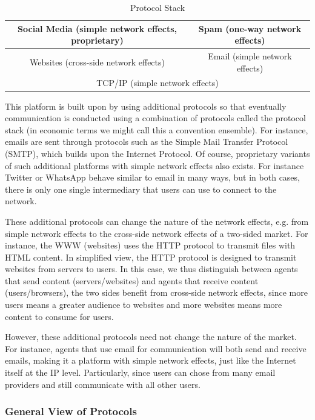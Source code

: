 \documentclass[a4paper,british]{article}\usepackage[]{graphicx}\usepackage[]{color}
\providecommand{\tabularnewline}{\\}
\begin{document}
\begin{table}[H]
\caption{Protocol Stack}

\centering{}%
\begin{tabular}{|c|c|}
\hline 
Social Media (simple network effects, proprietary) &
Spam (one-way network effects)\tabularnewline
\hline 
Websites (cross-side network effects) &
Email (simple network effects)\tabularnewline
\hline 
\multicolumn{2}{|c|}{TCP/IP (simple network effects)}\tabularnewline
\hline 
\end{tabular}
\end{table}

This platform is built upon by using additional protocols so that
eventually communication is conducted using a combination of protocols
called the protocol stack (in economic terms we might call this a
\textquotedbl convention ensemble\textquotedbl ). For instance,
emails are sent through protocols such as the Simple Mail Transfer
Protocol (SMTP), which builds upon the Internet Protocol. Of course,
proprietary variants of such additional platforms with simple network
effects also exists. For instance Twitter or WhatsApp behave similar
to email in many ways, but in both cases, there is only one single
intermediary that users can use to connect to the network.

These additional protocols can change the nature of the network effects,
e.g. from simple network effects to the cross-side network effects
of a two-sided market. For instance, the WWW (websites) uses the HTTP
protocol to transmit files with HTML content. In simplified view,
the HTTP protocol is designed to transmit websites from servers to
users. In this case, we thus distinguish between agents that send
content (servers/websites) and agents that receive content (users/browsers),
the two sides benefit from cross-side network effects, since more
users means a greater audience to websites and more websites means
more content to consume for users.

However, these additional protocols need not change the nature of
the market. For instance, agents that use email for communication
will both send and receive emails, making it a platform with simple
network effects, just like the Internet itself at the IP level. Particularly,
since users can chose from many email providers and still communicate
with all other users. 

\subsubsection*{General View of Protocols}
\end{document}
